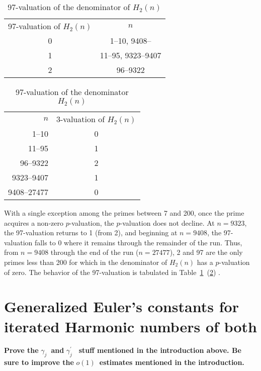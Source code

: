 \documentclass{article}
\begin{document}
\begin{table}[H]
  \centering
  \caption{97-valuation of the denominator of $H_2\left(n\right)$}
  \label{tab:97-val-of-H2}
\begin{tabular}{cc}
  97-valuation of $H_2\left(n\right)$ & $n$\\
  0 & 1--10, 9408-- \\
  1 & 11--95, 9323--9407 \\
  2 & 96--9322 
\end{tabular}
\end{table}

\begin{table}[H]
  \centering
  \caption{97-valuation of the denominator $H_2\left(n\right)$}
  \label{tab:97-val-of-H2-alt}
\begin{tabular}{rc}
  $n$         & 3-valuation of $H_2\left(n\right)$\\
  1--10       &  0\\
  11--95      &  1\\
  96--9322    &  2\\
  9323--9407  &  1\\
  9408--27477 &  0\\
\end{tabular}
\end{table}



With a single exception among the primes between 7 and 200, once the
prime acquires a non-zero $p$-valuation, the $p$-valuation does not
decline. At $n=9323$, the 97-valuation returns to 1 (from 2), and
beginning at $n=9408$, the 97-valuation falls to 0 where it remains
through the remainder of the run. Thus, from $n=9408$ through the end
of the run ($n=27477$), 2 and 97 are the only primes less than 200 for
which in the denominator of $H_{2}\left( n\right) $ has a
$p$-valuation of zero. The behavior of the 97-valuation is tabulated
in Table~\ref{tab:97-val-of-H2}~(\ref{tab:97-val-of-H2-alt}) .


\bigskip 

\section{Generalized Euler's constants for iterated Harmonic numbers of both}

\textbf{Prove the }$\gamma _{j}$\textbf{\ and }$\gamma _{j}^{\prime }$%
\textbf{\ stuff mentioned in the introduction above. Be sure to improve the }%
$o\left( 1\right) $\textbf{\ estimates mentioned in the introduction.}
\end{document}
